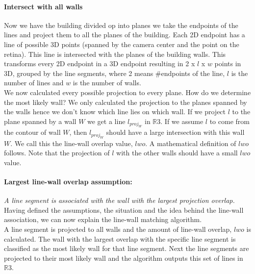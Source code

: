 	\paragraph{Intersect with all walls}
	Now we have the building divided op into planes we take the endpoints of the
	lines and project them to all the planes of the building.  Each 2D endpoint
	has a line of possible 3D points (spanned by the camera center and the point
	on the retina). This line is intersected with the planes of the building
	walls.  This transforms every 2D endpoint in a 3D endpoint resulting in 2 x
	$l$ x $w$ points in 3D, grouped by the line segments, where 2 means
	\#endpoints of the line, $l$ is the number of lines and $w$ is the number of
	walls.\\

	We now calculated every possible projection to every plane. How do we
	determine the most likely wall?  We only calculated the projection to the
	planes spanned by the walls hence we don't know which line lies on which
	wall.  If we project $l$ to the plane spanned
	by a wall $W$ we get a line $l_{proj_W}$ in $\mathbb{R}3$.  If we assume
	$l$ to come from the contour of wall $W$, then $l_{proj_W}$ should have a large
	intersection with this wall $W$. 
	We call this the line-wall overlap value, $lwo$.  A mathematical
	definition of $lwo$ follows.  Note that the projection of $l$ with the
	other walls should have a small $lwo$ value.\\

	\paragraph{Largest line-wall overlap assumption:}
	\emph{A line segment is associated with the wall with the largest projection
	overlap.}\\

	Having defined the assumptions, the situation and the idea behind the
	line-wall association, we can now explain the line-wall matching algorithm.\\ 

	A line segment is projected to all walls and the amount of line-wall
	overlap, $lwo$ is calculated. The wall with the largest overlap with the specific line
segment is classified as the most likely wall for that line segment.
	Next the line segments are projected to their most likely wall and the
	algorithm outputs this set of lines in $\mathbb{R}3$. 
	

